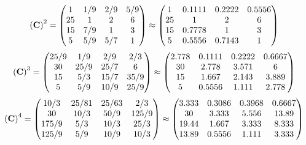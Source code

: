 \documentclass[10pt,a4paper]{article}
\begin{document}
	\[
		\left(\bold{C}\right)^{2} = 
		\begin{pmatrix}
			{1}{} & {1} / {{9}} & {{2}} / {{9}} & {{5}} / {{9}} \\
			{{25}}{} & {1}{} & {{2}}{} & {{6}}{} \\
			{{15}}{} & {{7}} / {{9}} & {1}{} & {{3}}{} \\
			{{5}}{} & {{5}} / {{9}} & {{5}} / {{7}} & {1}{} \\
		\end{pmatrix}
		\approx
		\begin{pmatrix}
			1        & 0.1111   & 0.2222   & 0.5556   \\
			25       & 1        & 2        & 6        \\
			15       & 0.7778   & 1        & 3        \\
			5        & 0.5556   & 0.7143   & 1        \\
		\end{pmatrix}
	\]
	\[
		\left(\bold{C}\right)^{3} = 
		\begin{pmatrix}
			{{25}} / {{9}} & {1} / {{9}} & {{2}} / {{9}} & {{2}} / {{3}} \\
			{{30}}{} & {{25}} / {{9}} & {{25}} / {{7}} & {{6}}{} \\
			{{15}}{} & {{5}} / {{3}} & {{15}} / {{7}} & {{35}} / {{9}} \\
			{{5}}{} & {{5}} / {{9}} & {{10}} / {{9}} & {{25}} / {{9}} \\
		\end{pmatrix}
		\approx
		\begin{pmatrix}
			2.778    & 0.1111   & 0.2222   & 0.6667   \\
			30       & 2.778    & 3.571    & 6        \\
			15       & 1.667    & 2.143    & 3.889    \\
			5        & 0.5556   & 1.111    & 2.778    \\
		\end{pmatrix}
	\]
	\[
		\left(\bold{C}\right)^{4} = 
		\begin{pmatrix}
			{{10}} / {{3}} & {{25}} / {{81}} & {{25}} / {{63}} & {{2}} / {{3}} \\
			{{30}}{} & {{10}} / {{3}} & {{50}} / {{9}} & {{125}} / {{9}} \\
			{{175}} / {{9}} & {{5}} / {{3}} & {{10}} / {{3}} & {{25}} / {{3}} \\
			{{125}} / {{9}} & {{5}} / {{9}} & {{10}} / {{9}} & {{10}} / {{3}} \\
		\end{pmatrix}
		\approx
		\begin{pmatrix}
			3.333    & 0.3086   & 0.3968   & 0.6667   \\
			30       & 3.333    & 5.556    & 13.89    \\
			19.44    & 1.667    & 3.333    & 8.333    \\
			13.89    & 0.5556   & 1.111    & 3.333    \\
		\end{pmatrix}
	\]
\end{document}
